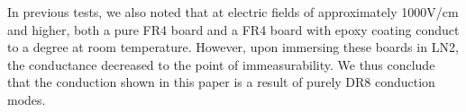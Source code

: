\documentclass[a4paper,12pt]{article}
\newcommand{\RI}[1]{\textcolor{blue}{#1}}
\begin{document}
In previous tests, we also noted that at electric fields of approximately 1000V/cm and higher, both a pure FR4 board and a FR4 board with epoxy coating conduct to a degree at room temperature. However, upon immersing these boards in LN2, the conductance decreased to the point of immeasurability. We thus conclude that the conduction shown in this paper is a result of purely DR8 conduction modes.

\end{document}
